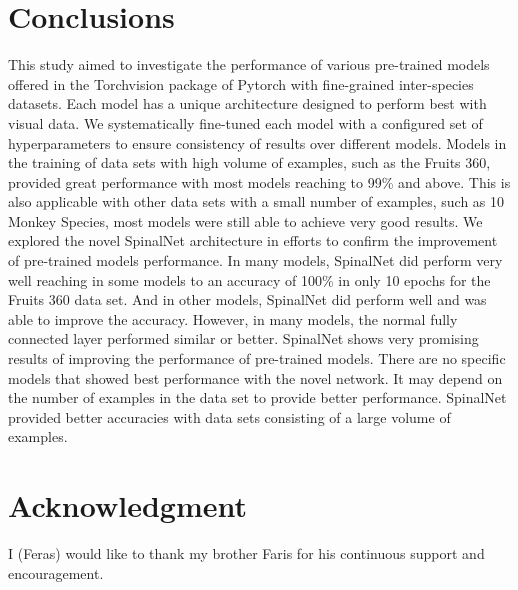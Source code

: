 \documentclass[conference]{IEEEtran}
\begin{document}
\section{Conclusions}
This study aimed to investigate the performance of various pre-trained models offered in the Torchvision package of Pytorch with fine-grained inter-species datasets. Each model has a unique architecture designed to perform best with visual data. We systematically fine-tuned each model with a configured set of hyperparameters to ensure consistency of results over different models. Models in the training of data sets with high volume of examples, such as the Fruits 360, provided great performance with most models reaching to 99\% and above. This is also applicable with other data sets with a small number of examples, such as 10 Monkey Species, most models were still able to achieve very good results. We explored the novel SpinalNet architecture in efforts to confirm the improvement of pre-trained models performance. In many models, SpinalNet did perform very well reaching in some models to an accuracy of 100\% in only 10 epochs for the Fruits 360 data set. And in other models, SpinalNet did perform well and was able to improve the accuracy. However, in many models, the normal fully connected layer performed similar or better. SpinalNet shows very promising results of improving the performance of pre-trained models. There are no specific models that showed best performance with the novel network. It may depend on the number of examples in the data set to provide better performance. SpinalNet provided better accuracies with data sets consisting of a large volume of examples. 



\section*{Acknowledgment}
I (Feras) would like to thank my brother Faris for his continuous support and encouragement.



\end{document}
